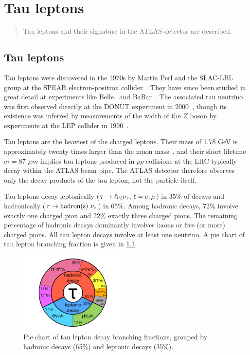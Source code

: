\chapter[Tau leptons][Tau leptons]{Tau leptons}
\label{chap:taus}

\begin{quote}
  Tau leptons and their signature in the ATLAS detector are described. 
\end{quote}


\section{Tau leptons}
\label{sec:taus-theory}

Tau leptons were discovered in the 1970s by Martin Perl and the SLAC-LBL group at the SPEAR electron-positron collider~\cite{1975.Perl.discovery_of_tau_1,1976.Perl.discovery_of_tau_2,1977.Perl.discovery_of_tau_3}. They have since been studied in great detail at experiments like Belle~\cite{2014.belle.tau-lifetime} and BaBar~\cite{2009.babar.tau-mass}. The associated tau neutrino was first observed directly at the DONUT experiment in 2000~\cite{2001.Kodama.discovery_of_tau_neutrino}, though its existence was inferred by measurements of the width of the $Z$ boson by experiments at the LEP collider in 1990~\cite{1990.ALEPH.3-neutrino-families}.

Tau leptons are the heaviest of the charged leptons. Their mass of 1.78 GeV is approximately twenty times larger than the muon mass~\cite{2012.PDG}, and their short lifetime $c\tau = \text{87 } \mu m$ implies tau leptons produced in $pp$ collisions at the LHC typically decay within the ATLAS beam pipe. The ATLAS detector therefore observes only the decay products of the tau lepton, not the particle itself.

Tau leptons decay leptonically ($\tau \rightarrow \ell\nu_\ell\nu_\tau \text{, } \ell = e,\mu$) in 35\% of decays and hadronically ($\tau \rightarrow \text{hadron(s) }\nu_\tau$) in 65\%. Among hadronic decays, 72\% involve exactly one charged pion and 22\% exactly three charged pions. The remaining percentage of hadronic decays dominantly involves kaons or five (or more) charged pions. All tau lepton decays involve at least one neutrino. A pie chart of tau lepton branching fraction is given in \cref{fig:taus-decaypie}.

\begin{figure}[tp]
  \centering
  \includegraphics[width=0.48\textwidth]{figures/piecharts/taudecay}
  \caption{Pie chart of tau lepton decay branching fractions, grouped by hadronic decays (65\%) and leptonic decays (35\%).}
  \label{fig:taus-decaypie}
\end{figure}

